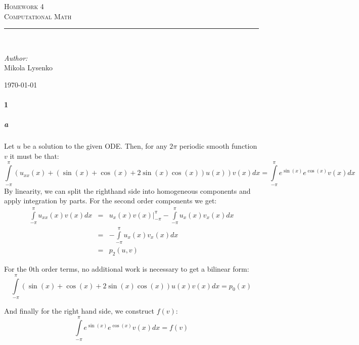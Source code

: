 \documentclass{article}
\newcommand{\HRule}{\rule{\linewidth}{0.5mm}}
\begin{document}
\begin{titlepage}
 
\begin{center}
 
\textsc{\LARGE Homework 4}\\[1.5cm] 

\textsc{\Large Computational Math}\\[0.5cm]
 
 
\HRule \\[2cm]
 
\begin{minipage}{0.4\textwidth}
\begin{flushleft} \large
\emph{Author:}\\
Mikola Lysenko
\end{flushleft}
\end{minipage}
 
\vfill
 
{\large \today}
 
\end{center}
 
\end{titlepage}


\paragraph{1}

\subparagraph{a}
Let $u$ be a solution to the given ODE.  Then, for any $2\pi$ periodic smooth function $v$ it must be that:
\[ \int \limits_{-\pi}^{\pi} (u_{xx}(x) + \left( \sin(x) + \cos(x) + 2 \sin(x) \cos(x) \right) u(x)) v(x) dx = \int \limits_{-\pi}^{\pi} e^{\sin(x)} e^{\cos(x)} v(x) dx \]
By linearity, we can split the righthand side into homogeneous components and apply integration by parts.  For the second order components we get:
\begin{eqnarray*}
\int \limits_{-\pi}^{\pi} u_{xx}(x) v(x) dx & = & u_{x}(x)v(x) |_{-\pi}^{\pi} - \int \limits_{-\pi}^{\pi} u_{x}(x) v_x(x) dx \\
& = & -\int \limits_{-\pi}^{\pi} u_x(x) v_x(x) dx \\
& = & p_2(u, v)
\end{eqnarray*}

For the 0th order terms, no additional work is necessary to get a bilinear form:
\[ \int \limits_{-\pi}^{\pi} \left( \sin(x) + \cos(x) + 2 \sin(x) \cos(x) \right) u(x) v(x) dx = p_0(x) \]

And finally for the right hand side, we construct $f(v)$:
\[ \int \limits_{-\pi}^{\pi} e^{\sin(x)} e^{\cos(x)} v(x) dx = f(v) \]
\end{document}
